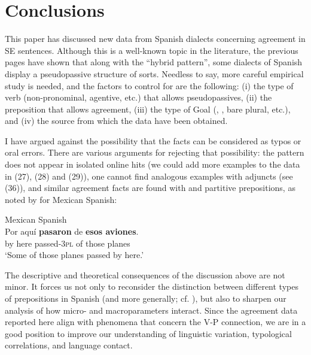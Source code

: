 \documentclass[output=paper]{langsci/langscibook}
\begin{document}
\section{Conclusions}%
This paper has discussed new data from Spanish dialects concerning agreement in SE sentences. Although this is a well-known topic in the literature, the previous pages have shown that along with the “hybrid pattern”, some dialects of Spanish display a pseudopassive structure of sorts. Needless to say, more careful empirical study is needed, and the factors to control for are the following: (i) the type of verb (non-pronominal, agentive, etc.) that allows pseudopassives, (ii) the preposition that allows agreement, (iii) the type of Goal (\CATDP, \CATNP, bare plural, etc.), and (iv) the source from which the data have been obtained. 

I have argued against the possibility that the facts can be considered as typos or oral errors. There are various arguments for rejecting that possibility: the pattern does not appear in isolated online hits (we could add more examples to the data in (27), (28) and (29)), one cannot find analogous examples with adjuncts (see (36)), and similar agreement facts are found with \DOM and partitive prepositions, as noted by \citet{Treviño2010} for Mexican Spanish:

 
\ea%
    Mexican Spanish\label{ex:gallego:43}\\
    \gll Por  aquí   \textbf{pasaron}      de  \textbf{esos   aviones}. \\
         by    here  passed-\textsc{3pl}  of  those  planes\\
    \glt ‘Some of those planes passed by here.’
\z

The descriptive and theoretical consequences of the discussion above are not minor. It forces us not only to reconsider the distinction between different types of prepositions in Spanish (and more generally; cf. \citealt{Demonte1987,Demonte1991,Demonte1995,Abels2003,Cuervo2003,Pesetsky2004,Romero2011}), but also to sharpen our analysis of how micro- and macroparameters interact. Since the agreement data reported here align with phenomena that concern the V-P connection, we are in a good position to improve our understanding of linguistic variation, typological correlations, and language contact.
\end{document}
